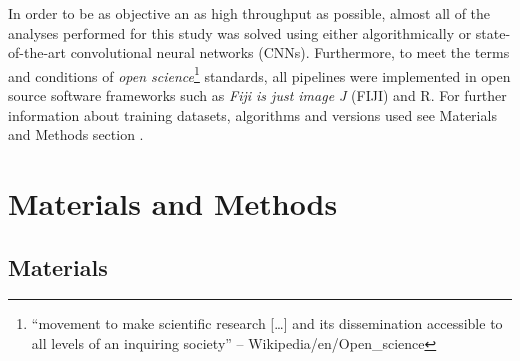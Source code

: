\documentclass[11pt,singlespacinge,twoside]{reedthesis} %
\begin{document}
In order to be as objective an as high throughput as possible, almost all of the analyses performed for this study was solved using either algorithmically or state-of-the-art convolutional neural networks (CNNs). Furthermore, to meet the terms and conditions of \emph{open science}\footnote{``movement to make scientific research {[}\ldots{}{]} and its dissemination accessible to all levels of an inquiring society'' -- Wikipedia/en/Open\_science} standards, all pipelines were implemented in open source software frameworks such as \emph{Fiji is just image J} (FIJI) and R. For further information about training datasets, algorithms and versions used see Materials and Methods section .

\hypertarget{mat-met}{%
\chapter{Materials and Methods}\label{mat-met}}

\hypertarget{mat}{%
\section{Materials}\label{mat}}
\end{document}
